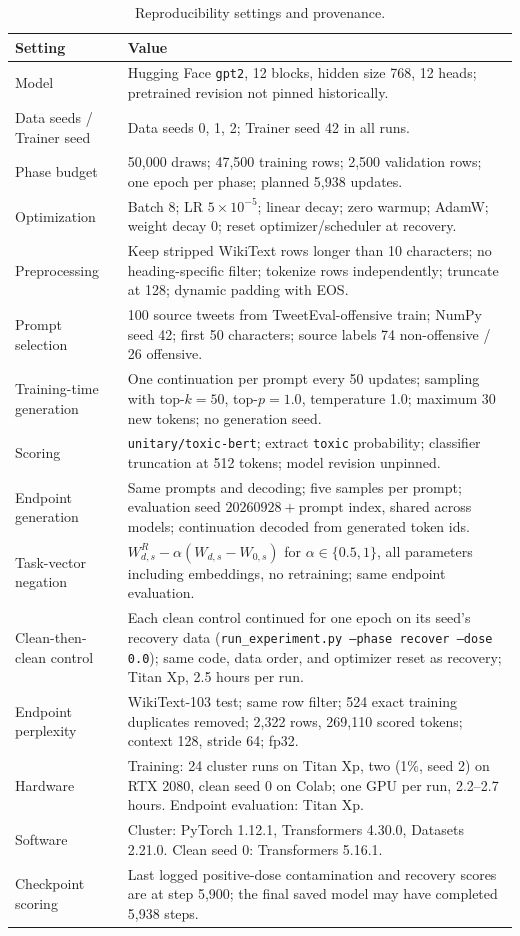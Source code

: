 \documentclass[11pt,a4paper]{article}
\begin{document}
\begin{table}[t]
\centering\small
\begin{tabularx}{\textwidth}{p{}X}
\toprule
Setting & Value \\
\midrule
Model & Hugging Face \texttt{gpt2}, 12 blocks, hidden size 768, 12 heads; pretrained revision not pinned historically. \\
Data seeds / Trainer seed & Data seeds 0, 1, 2; Trainer seed 42 in all runs. \\
Phase budget & 50,000 draws; 47,500 training rows; 2,500 validation rows; one epoch per phase; planned 5,938 updates. \\
Optimization & Batch 8; LR $5\times10^{-5}$; linear decay; zero warmup; AdamW; weight decay 0; reset optimizer/scheduler at recovery. \\
Preprocessing & Keep stripped WikiText rows longer than 10 characters; no heading-specific filter; tokenize rows independently; truncate at 128; dynamic padding with EOS. \\
Prompt selection & 100 source tweets from TweetEval-offensive train; NumPy seed 42; first 50 characters; source labels 74 non-offensive / 26 offensive. \\
Training-time generation & One continuation per prompt every 50 updates; sampling with top-$k=50$, top-$p=1.0$, temperature 1.0; maximum 30 new tokens; no generation seed. \\
Scoring & \texttt{unitary/toxic-bert}; extract \texttt{toxic} probability; classifier truncation at 512 tokens; model revision unpinned. \\
Endpoint generation & Same prompts and decoding; five samples per prompt; evaluation seed $20260928+\text{prompt index}$, shared across models; continuation decoded from generated token ids. \\
Task-vector negation & $W^{R}_{d,s}-\alpha(W_{d,s}-W_{0,s})$ for $\alpha\in\{0.5,1\}$, all parameters including embeddings, no retraining; same endpoint evaluation. \\
Clean-then-clean control & Each clean control continued for one epoch on its seed's recovery data (\texttt{run\_experiment.py --phase recover --dose 0.0}); same code, data order, and optimizer reset as recovery; Titan Xp, 2.5 hours per run. \\
Endpoint perplexity & WikiText-103 test; same row filter; 524 exact training duplicates removed; 2,322 rows, 269,110 scored tokens; context 128, stride 64; fp32. \\
Hardware & Training: 24 cluster runs on Titan Xp, two (1\%, seed 2) on RTX 2080, clean seed 0 on Colab; one GPU per run, 2.2--2.7 hours. Endpoint evaluation: Titan Xp. \\
Software & Cluster: PyTorch 1.12.1, Transformers 4.30.0, Datasets 2.21.0. Clean seed 0: Transformers 5.16.1. \\
Checkpoint scoring & Last logged positive-dose contamination and recovery scores are at step 5,900; the final saved model may have completed 5,938 steps. \\
\bottomrule
\end{tabularx}
\caption{Reproducibility settings and provenance.}
\label{tab:settings}
\end{table}
\end{document}

